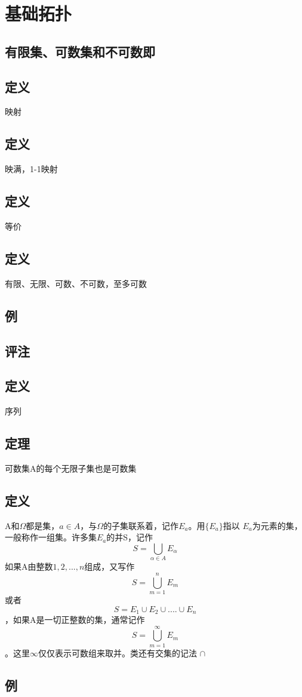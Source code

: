 \chapter{基础拓扑}
\section*{有限集、可数集和不可数即}
\section{定义}映射
\section{定义}映满，1-1映射
\section{定义}等价
\section{定义}有限、无限、可数、不可数，至多可数
\section{例}
\section{评注}
\section{定义}序列
\section{定理}可数集A的每个无限子集也是可数集
\section{定义}A和$\Omega$都是集，$ a \in A $，与$\Omega$的子集联系着，记作$E_a$。用$\{E_a\}$指以
$E_a$为元素的集，一般称作一组集。许多集$E_a$的并S，记作$$ S = \bigcup_{\alpha \in A }E_{\alpha} $$
如果A由整数$1,2,...,n$组成，又写作$$ S=\bigcup_{m=1}^nE_m $$ 或者 $$ S = E_1 \cup E_2 \cup .... \cup E_n $$ ，如果A是一切正整数的集，通常记作 $$ S = \bigcup_{m=1}^{\infty}E_m $$。这里$\infty$仅仅表示可数组来取并。类还有交集的记法 $\cap$
\section{例}

